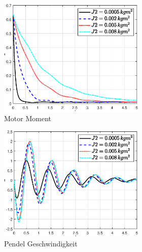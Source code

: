 \begin{figure}
\begin{figure}
\begin{subfigure}[b]{0.49\linewidth}
        \includegraphics[width=\linewidth]{Bilder/5_sensi/fig/j2/tau.eps}
        \caption{Motor Moment}
        \label{fig:j2_tau}
    \end{subfigure}
    \begin{subfigure}[b]{0.49\linewidth}
        \includegraphics[width=\linewidth]{Bilder/5_sensi/fig/j2/theta_punkt.eps}
        \caption{Pendel Geschwindigkeit}
        \label{fig:j2_theta_punkt}      
    \end{subfigure}
    \begin{subfigure}[b]{0.49\linewidth}

\end{subfigure}
\end{figure}
\end{figure}
